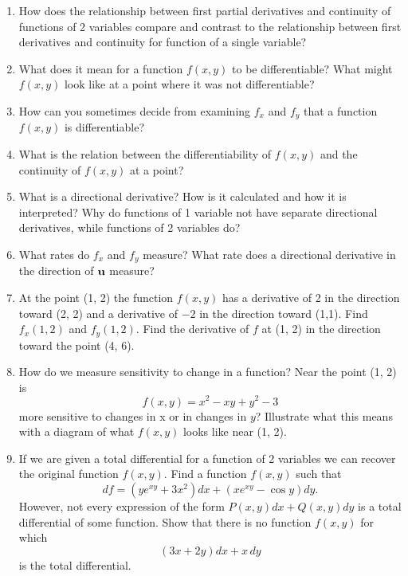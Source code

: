 \begin{enumerate}
\item  How does the relationship between first partial derivatives and continuity of functions of 2 variables compare and contrast to the relationship between first derivatives and continuity for function of a single variable?  \cite{FWG}

\item  What does it mean for a function $f(x, y)$ to be differentiable?  What might $f(x, y)$ look like at a point where it was not differentiable?

\item  How can you sometimes decide from examining $f_x$ and $f_y$ that a function $f(x,y)$ is differentiable?  \cite{FWG}

\item  What is the relation between the differentiability of $f(x,y)$ and the continuity of $f(x,y)$ at a point?  \cite{FWG}

\item  What is a directional derivative?  How is it calculated and how it is interpreted?  Why do functions of 1 variable not have separate directional derivatives, while functions of 2 variables do?

\item  What rates do $f_x$ and $f_y$ measure?  What rate does a directional derivative in the direction of ${\bf{u}}$ measure?

\item  At the point (1, 2) the function $f(x,y)$ has a derivative of 2 in the direction toward (2, 2) and a derivative of $-2$ in the direction toward (1,1).  Find $f_x(1, 2)$ and $f_y(1, 2)$.  Find the derivative of $f$ at (1, 2) in the direction toward the point (4, 6).  \cite{FWG}

\item  How do we measure sensitivity to change in a function?  Near the point (1, 2) is $$f(x,y) = x^2  - xy + y^2  - 3$$ more sensitive to changes in x or in changes in $y$?  Illustrate what this means with a diagram of what $f(x,y)$ looks like near (1, 2).

\item  If we are given a total differential for a function of 2 variables we can recover the original function $f(x, y)$.  Find a function $f(x,y)$ such that $$df = \left( {ye^{xy}  + 3x^2 } \right)dx + \left( {xe^{xy}  - \cos y} \right)dy.$$  However, not every expression of the form 
$P(x, y)dx + Q(x, y)dy$ is a total differential of some function.  Show that there is no function $f(x,y)$ for which $$\left( {3x + 2y} \right)dx + x\,dy$$ is the total differential.


\end{enumerate}
